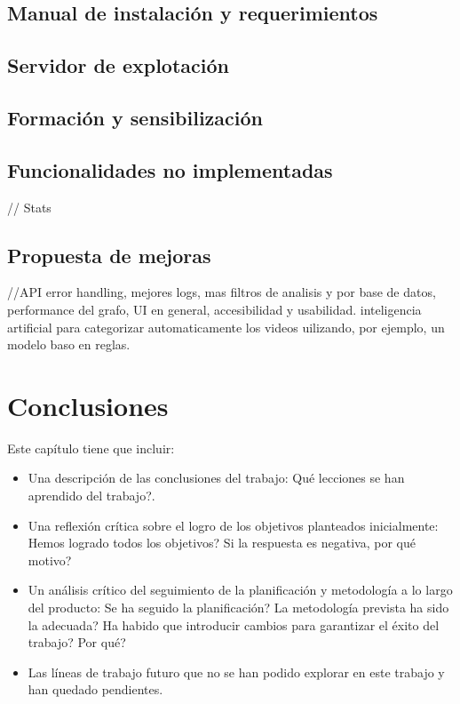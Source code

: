 \documentclass[11pt,a4paper]{article}
\begin{document}
\subsection{Manual de instalación y requerimientos}
\medskip 

\subsection{Servidor de explotación}
\medskip 

\subsection{Formación y sensibilización}
\medskip 

\subsection{Funcionalidades no implementadas}
// Stats
\medskip 

\subsection{Propuesta de mejoras}
//API error handling, mejores logs, mas filtros de analisis y por base de datos, performance del grafo, UI en general, accesibilidad y usabilidad. inteligencia artificial para categorizar automaticamente los videos uilizando, por ejemplo, un modelo baso en reglas.
\newpage 




\section{Conclusiones}
\bigskip 

Este capítulo tiene que incluir:
\begin{itemize}
\item Una descripción de las conclusiones del trabajo: Qué lecciones se han aprendido del trabajo?.
\item Una reflexión crítica sobre el logro de los objetivos planteados inicialmente: Hemos logrado todos los objetivos? Si la respuesta es negativa, por qué motivo? 
\item Un análisis crítico del seguimiento de la planificación y metodología a lo largo del producto: Se ha seguido la planificación? La metodología prevista ha sido la adecuada? Ha habido que introducir cambios para garantizar el éxito del trabajo? Por qué? 
\item Las líneas de trabajo futuro que no se han podido explorar en este trabajo y han quedado pendientes.
\end{itemize}
\end{document}
